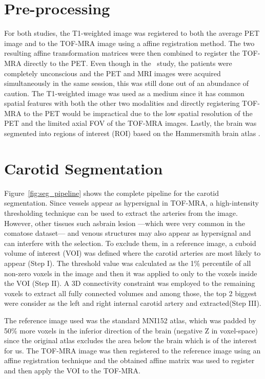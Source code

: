 \section{Pre-processing}
For both studies, the T1-weighted image was registered to both the average PET image and to the TOF-MRA image using a affine registration method.
The two resulting affine transformation matrices were then combined to register the TOF-MRA directly to the PET.
Even though in the \fdg $\,$ study, the patients were completely unconscious and the PET and MRI images were acquired simultaneously in the same session, this was still done out of an abundance of caution.
The T1-weighted image was used as a medium since it has common spatial features with both the other two modalities and directly registering TOF-MRA to the PET would be impractical due to the low spatial resolution of the PET and the limited axial FOV of the TOF-MRA images.
Lastly, the brain was segmented into regions of interest (ROI) based on the Hammersmith brain atlas \cite{hammers2003three}.
\section{Carotid Segmentation\label{sec:carotid}}
Figure~\ref{fig:seg_pipeline} shows the complete pipeline for the carotid segmentation.
Since vessels appear as hypersignal in TOF-MRA, a high-intensity thresholding technique can be used to extract the arteries from the image.
However, other tissues such asbrain lesion ---which were very common in the comatose dataset--- and venous structures may also appear as hypersignal and can interfere with the selection.  
To exclude them, in a reference image, a cuboid volume of interest (VOI) was defined where the carotid arteries are most likely to appear (Step I).
The threshold value was calculated as the 1\% percentile of all non-zero voxels in the image and then it was applied to only to the voxels inside the VOI (Step II).
A 3D connectivity constraint was employed to the remaining voxels to extract all fully connected volumes and among those, the top 2 biggest were consider as the left and right internal carotid artery and extracted(Step III).

The reference image used was the standard MNI152 atlas, which was padded by 50\% more voxels in the inferior direction of the brain (negative Z in voxel-space) since the original atlas excludes the area below the brain which is of the interest for us.
The TOF-MRA image was then registered to the reference image using an affine registration technique and the obtained affine matrix was used to register and then apply the VOI to the TOF-MRA.

